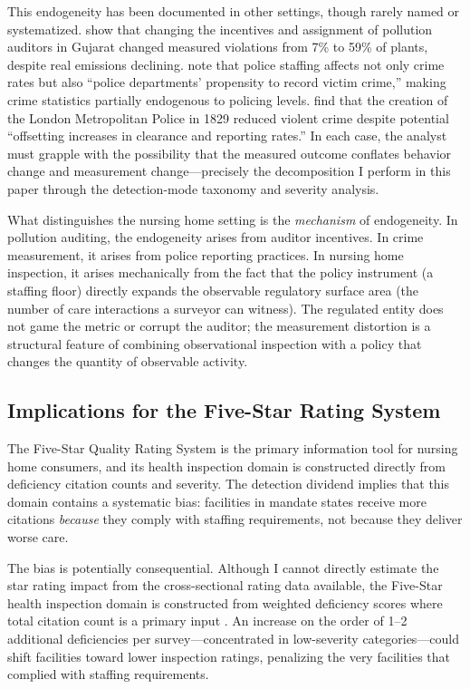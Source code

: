 \documentclass[12pt]{article}
\begin{document}
This endogeneity has been documented in other settings, though rarely named or systematized. \citet{duflo2013} show that changing the incentives and assignment of pollution auditors in Gujarat changed measured violations from 7\% to 59\% of plants, despite real emissions declining. \citet{chalfin2018} note that police staffing affects not only crime rates but also ``police departments' propensity to record victim crime,'' making crime statistics partially endogenous to policing levels. \citet{bindler2021} find that the creation of the London Metropolitan Police in 1829 reduced violent crime despite potential ``offsetting increases in clearance and reporting rates.'' In each case, the analyst must grapple with the possibility that the measured outcome conflates behavior change and measurement change---precisely the decomposition I perform in this paper through the detection-mode taxonomy and severity analysis.

What distinguishes the nursing home setting is the \textit{mechanism} of endogeneity. In pollution auditing, the endogeneity arises from auditor incentives. In crime measurement, it arises from police reporting practices. In nursing home inspection, it arises mechanically from the fact that the policy instrument (a staffing floor) directly expands the observable regulatory surface area (the number of care interactions a surveyor can witness). The regulated entity does not game the metric or corrupt the auditor; the measurement distortion is a structural feature of combining observational inspection with a policy that changes the quantity of observable activity.

\subsection{Implications for the Five-Star Rating System}

The Five-Star Quality Rating System is the primary information tool for nursing home consumers, and its health inspection domain is constructed directly from deficiency citation counts and severity. The detection dividend implies that this domain contains a systematic bias: facilities in mandate states receive more citations \textit{because} they comply with staffing requirements, not because they deliver worse care.

The bias is potentially consequential. Although I cannot directly estimate the star rating impact from the cross-sectional rating data available, the Five-Star health inspection domain is constructed from weighted deficiency scores where total citation count is a primary input \citep{cms2023som}. An increase on the order of 1--2 additional deficiencies per survey---concentrated in low-severity categories---could shift facilities toward lower inspection ratings, penalizing the very facilities that complied with staffing requirements.
\end{document}
